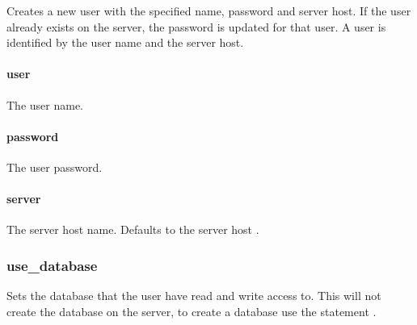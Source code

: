 Creates a new user with the specified name, password and server host.
If the user already exists on the server, the password is updated for that user.
A user is identified by the user name and the server host.

\paragraph{user}

The user name.

\paragraph{password}

The user password.

\paragraph{server}

The server host name. Defaults to the server host .

\subsubsection{use\_database}


Sets the database that the user have read and write access to. This will not create
the database on the server, to create a database use the statement .

